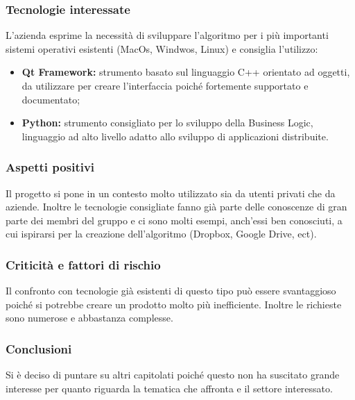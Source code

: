 \subsubsection{Tecnologie interessate}
L'azienda esprime la necessità di sviluppare l'algoritmo per i più importanti sistemi operativi esistenti (MacOs, Windwos, Linux) e consiglia l'utilizzo:
\begin{itemize}
\item \textbf{Qt Framework:} strumento basato sul linguaggio C++ orientato ad oggetti, da utilizzare per creare l'interfaccia poiché fortemente supportato e documentato;
\item \textbf{Python:} strumento consigliato per lo sviluppo della Business Logic, linguaggio ad alto livello adatto allo sviluppo di applicazioni distribuite.
\end{itemize}
\subsubsection{Aspetti positivi}
Il progetto si pone in un contesto molto utilizzato sia da utenti privati che da aziende. Inoltre le tecnologie consigliate fanno già parte delle conoscenze di gran parte dei membri del gruppo e ci sono molti esempi, anch'essi ben conosciuti, a cui ispirarsi per la creazione dell'algoritmo (Dropbox, Google Drive, ect). 
\subsubsection{Criticità e fattori di rischio}
Il confronto con tecnologie già esistenti di questo tipo può essere svantaggioso poiché si potrebbe creare un prodotto molto più inefficiente. Inoltre le richieste sono numerose e abbastanza complesse. 
\subsubsection{Conclusioni}
Si è deciso di puntare su altri capitolati poiché questo non ha suscitato grande interesse per quanto riguarda la tematica che affronta e il settore interessato. 